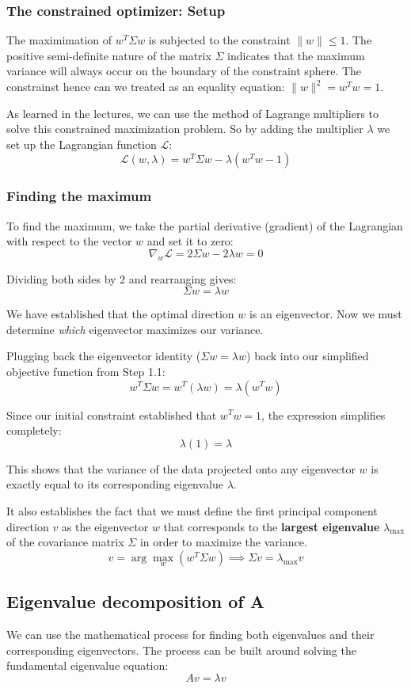 \documentclass[twoside, 10pt]{article}
\begin{document}
\subsubsection{The constrained optimizer: Setup} %
The maximimation of $w^T \Sigma w$ is subjected to the constraint $\|w\| \le 1$. The positive semi-definite nature of the matrix $\Sigma$ indicates that the maximum variance will always occur on the boundary of the constraint sphere. The constrainst hence can we treated as an equality equation: $\|w\|^2 = w^T w = 1$.

As learned in the lectures, we can use the method of Lagrange multipliers to solve this constrained maximization problem. So by adding the multiplier $\lambda$ we set up the Lagrangian function $\mathcal{L}$:
\[ \mathcal{L}(w, \lambda) = w^T \Sigma w - \lambda (w^T w - 1) \]

\subsubsection{Finding the maximum} %
To find the maximum, we take the partial derivative (gradient) of the Lagrangian with respect to the vector $w$ and set it to zero:
\[ \nabla_w \mathcal{L} = 2 \Sigma w - 2 \lambda w = 0 \]

Dividing both sides by 2 and rearranging gives:
\[ \Sigma w = \lambda w \]

We have established that the optimal direction $w$ is an eigenvector. Now we must determine \emph{which} eigenvector maximizes our variance.

Plugging back the eigenvector identity ($\Sigma w = \lambda w$) back into our simplified objective function from Step 1.1:
\[ w^T \Sigma w = w^T (\lambda w) = \lambda (w^T w) \]

Since our initial constraint established that $w^T w = 1$, the expression simplifies completely:
\[ \lambda(1) = \lambda \]

This shows that the variance of the data projected onto any eigenvector $w$ is exactly equal to its corresponding eigenvalue $\lambda$.

It also establishes the fact that we must define the first principal component direction $v$ as the eigenvector $w$ that corresponds to the \textbf{largest eigenvalue} $\lambda_{\max}$ of the covariance matrix $\Sigma$ in order to maximize the variance. 
\[ v = \arg\max_{w} (w^T \Sigma w) \implies \Sigma v = \lambda_{\max} v \]

\subsection{Eigenvalue decomposition of A} %
We can use the mathematical process for finding both eigenvalues and their corresponding eigenvectors. The process can be built around solving the fundamental eigenvalue equation:
\[ Av = \lambda v \]
\end{document}
